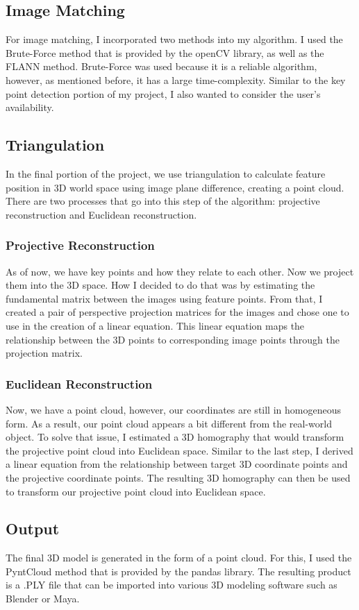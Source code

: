 \documentclass[10pt,twocolumn]{article}
\begin{document}
\subsection{Image Matching}
For image matching, I incorporated two methods into my algorithm. I used the Brute-Force method that is provided by the openCV library, as well as the FLANN method. Brute-Force was used because it is a reliable algorithm, however, as mentioned before, it has a large time-complexity. Similar to the key point detection portion of my project, I also wanted to consider the user's availability. 

\subsection{Triangulation}
In the final portion of the project, we use triangulation to calculate feature position in 3D world space using image plane difference, creating a point cloud. There are two processes that go into this step of the algorithm: projective reconstruction and Euclidean reconstruction.
\subsubsection{Projective Reconstruction}
As of now, we have key points and how they relate to each other. Now we project them into the 3D space. How I decided to do that was by estimating the fundamental matrix between the images using feature points. From that, I created a pair of perspective projection matrices for the images and chose one to use in the creation of a linear equation. This linear equation maps the relationship between the 3D points to corresponding image points through the projection matrix.
\subsubsection{Euclidean Reconstruction}
Now, we have a point cloud, however, our coordinates are still in homogeneous form. As a result, our point cloud appears a bit different from the real-world object. To solve that issue, I estimated a 3D homography that would transform the projective point cloud into Euclidean space. Similar to the last step, I derived a linear equation from the relationship between target 3D coordinate points and the projective coordinate points. The resulting 3D homography can then be used to transform our projective point cloud into Euclidean space.
\subsection{Output}
The final 3D model is generated in the form of a point cloud. For this, I used the PyntCloud method that is provided by the pandas library. The resulting product is a .PLY file that can be imported into various 3D modeling software such as Blender or Maya.
\end{document}
